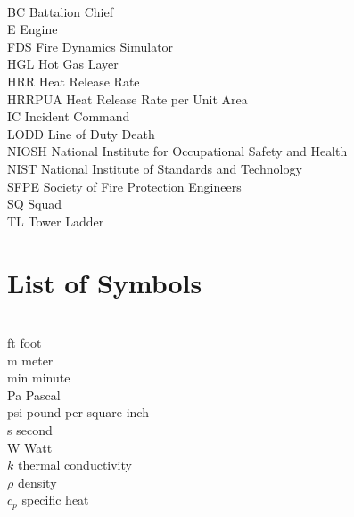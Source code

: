 \documentclass[12pt,oneside]{book}
\begin{document}
\begin{tabbing}
\hspace{1.5in} \= \\
BC \> Battalion Chief \\
E \> Engine \\
FDS \> Fire Dynamics Simulator \\
HGL \> Hot Gas Layer \\
HRR \> Heat Release Rate \\
HRRPUA \> Heat Release Rate per Unit Area \\
IC \> Incident Command \\
LODD \> Line of Duty Death \\
NIOSH \> National Institute for Occupational Safety and Health \\
NIST \> National Institute of Standards and Technology \\
SFPE \> Society of Fire Protection Engineers \\
SQ \> Squad \\
TL \> Tower Ladder \\
\end{tabbing}

\chapter{List of Symbols}

\begin{tabbing}
\hspace{1.5in} \= \\
ft \> foot \\
m \> meter \\
min \> minute \\
Pa \> Pascal \\
psi \> pound per square inch \\
s \> second \\
W \> Watt \\
$k$ \> thermal conductivity \\
$\rho$ \> density \\
$c_{p}$ \> specific heat \\
\end{tabbing}

\mainmatter
\end{document}
